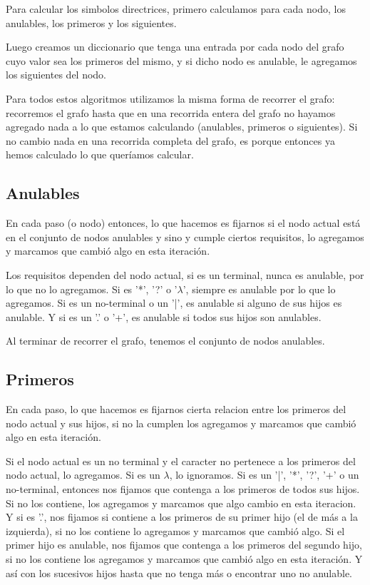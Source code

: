 \documentclass[a4paper]{report}
\begin{document}
Para calcular los simbolos directrices, primero calculamos para cada nodo, los
anulables, los primeros y los siguientes.


Luego creamos un diccionario que tenga una entrada por cada nodo del grafo cuyo
valor sea los primeros del mismo, y si dicho nodo es anulable, le agregamos los
siguientes del nodo.


Para todos estos algoritmos utilizamos la misma forma de recorrer el grafo:
recorremos el grafo hasta que en una recorrida entera del grafo no hayamos
agregado nada a lo que estamos calculando (anulables, primeros o siguientes). Si
no cambio nada en una recorrida completa del grafo, es porque entonces ya hemos
calculado lo que queríamos calcular.

\subsection*{Anulables}

	En cada paso (o nodo) entonces, lo que hacemos es fijarnos si el nodo
actual está en el conjunto de nodos anulables y sino y cumple ciertos
requisitos, lo agregamos y marcamos que cambió algo en esta iteración.


	Los requisitos dependen del nodo actual, si es un terminal, nunca es
anulable, por lo que no lo agregamos. Si es '*', '?' o '$\lambda$', siempre es anulable
por lo que lo agregamos. Si es un no-terminal o un '|', es anulable si alguno de
sus hijos es anulable. Y si es un '.' o '+', es anulable si todos sus hijos son
anulables.


	Al terminar de recorrer el grafo, tenemos el conjunto de nodos
anulables.

\subsection*{Primeros}

	En cada paso, lo que hacemos es fijarnos cierta relacion entre los primeros
del nodo actual y sus hijos, si no la cumplen los agregamos y marcamos que
cambió algo en esta iteración.


	Si el nodo actual es un no terminal y el caracter no pertenece a los
primeros del nodo actual, lo agregamos. Si es un $\lambda$, lo ignoramos. Si es un
'|', '*', '?', '+' o un no-terminal, entonces nos fijamos que contenga a los
primeros de todos sus hijos. Si no los contiene, los agregamos y marcamos que
algo cambio en esta iteracion. Y si es '.', nos fijamos si contiene a los
primeros de su primer hijo (el de más a la izquierda), si no los contiene lo
agregamos y marcamos que cambió algo. Si el primer hijo es anulable, nos fijamos
que contenga a los primeros del segundo hijo, si no los contiene los agregamos y
marcamos que cambió algo en esta iteración. Y así con los sucesivos hijos hasta
que no tenga más o encontrar uno no anulable.
\end{document}
